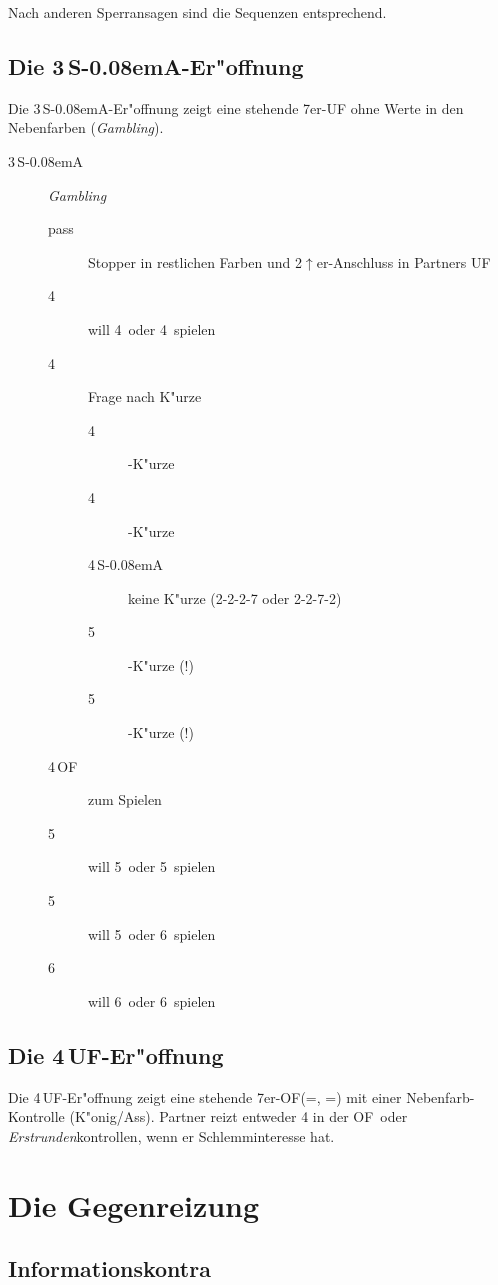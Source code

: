 \documentclass[11pt,german,twocolumn]{scrartcl}
\def\pik{\nobreak\,\Sp\xspace}
\def\coe{\nobreak\,\He\xspace}
\def\kar{\nobreak\,\Di\xspace}
\def\tre{\nobreak\,\Cl\xspace}
\def\pi{\Sp\xspace}
\def\co{\He\xspace}
\def\ka{\Di\xspace}
\def\tr{\Cl\xspace}
\def\pl{$\uparrow$\xspace}
\def\uf{\nobreak\textsf{\,UF}\xspace}
\def\of{\nobreak\textsf{\,OF}\xspace}
\def\ufa{\nobreak\textsf{UF}\xspace}
\def\ofa{\nobreak\textsf{OF}\xspace}
\def\sa{\nobreak\textsf{S\kern-0.08emA}\xspace}
\def\SA{\nobreak\,\sa}
\newcommand{\conv}[1]{\emph{#1}}
\def\bdsc{\begin{description}}
\def\edsc{\end{description}}
\begin{document}
Nach anderen Sperransagen sind die Sequenzen entsprechend.

\subsection{Die 3\SA-Er"offnung}

Die 3\SA-Er"offnung zeigt eine stehende 7er-\ufa ohne Werte in den
Nebenfarben (\conv{Gambling}).

\bdsc
\item[3\SA] \conv{Gambling}
  \bdsc
  \item[pass] Stopper in restlichen Farben und 2\pl{}er-Anschluss in Partners \ufa
  \item[4\tre] will 4\tre oder 4\kar spielen
  \item[4\kar] Frage nach K"urze
    \bdsc
    \item[4\coe] \co-K"urze
    \item[4\pik] \pi-K"urze
    \item[4\SA] keine K"urze (2-2-2-7 oder 2-2-7-2)
    \item[5\tre] \ka-K"urze (!)
    \item[5\kar] \tr-K"urze (!)
    \edsc
  \item[4\of] zum Spielen
  \item[5\tre] will 5\tre oder 5\kar spielen
  \item[5\kar] will 5\kar oder 6\tre spielen
  \item[6\tre] will 6\tre oder 6\kar spielen
  \edsc
\edsc

\subsection{Die 4\uf-Er"offnung}

Die 4\uf-Er"offnung zeigt eine stehende 7er-\ofa (\tr{}=\co, \ka{}=\pi) mit
einer Nebenfarb-Kontrolle (K"onig/Ass). Partner reizt entweder 4 in der \ofa\
oder \emph{Erstrunden}kontrollen, wenn er Schlemminteresse hat.

\newpage
\section{Die Gegenreizung\label{gegenreizung}}

\subsection{Informationskontra}
\end{document}
